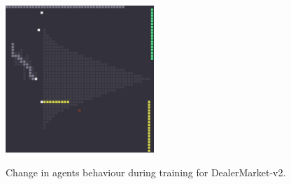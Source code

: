 \documentclass{kththesis}
\theoremstyle{definition}
\begin{document}
\begin{figure}[H]
{\includegraphics[width=0.5\textwidth]{best_2006eps.jpg}
\label{fig:svd4}}
\caption{Change in agents behaviour during training for DealerMarket-v2.}
\label{fig:vizd1}
\end{figure}
\end{document}
